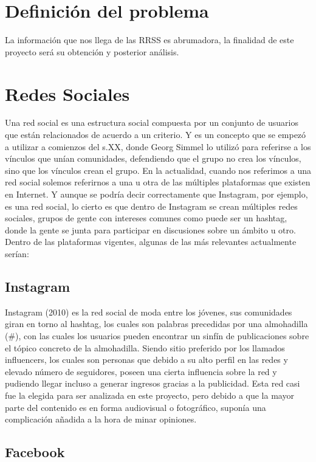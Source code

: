 	\section{Definición del problema}
	
	La información que nos llega de las RRSS es abrumadora, la finalidad de este proyecto será su obtención y posterior análisis.
	
	\section{Redes Sociales}
	
	Una red social es una estructura social compuesta por un conjunto de usuarios que están relacionados de acuerdo a un criterio. Y es un concepto que se empezó a utilizar a comienzos del s.XX, donde Georg Simmel lo utilizó para referirse a los vínculos que unían comunidades, defendiendo que el grupo no crea los vínculos, sino que los vínculos crean el grupo. En la actualidad, cuando nos referimos a una red social solemos referirnos a una u otra de las múltiples plataformas que existen en Internet. Y aunque se podría decir correctamente que Instagram, por ejemplo, es una red social, lo cierto es que dentro de Instagram se crean múltiples redes sociales, grupos de gente con intereses comunes como puede ser un hashtag, donde la gente se junta para participar en discusiones sobre un ámbito u otro. Dentro de las plataformas vigentes, algunas de las más relevantes actualmente serían: 
	
	\subsection{Instagram}
	
	Instagram (2010) es la red social de moda entre los jóvenes, sus comunidades giran en torno al hashtag, los cuales son palabras precedidas por una almohadilla (\#), con las cuales los usuarios pueden encontrar un sinfín de publicaciones sobre el tópico concreto de la almohadilla. Siendo sitio preferido por los llamados influencers, los cuales son personas que debido a su alto perfil en las redes y elevado número de seguidores, poseen una cierta influencia sobre la red y pudiendo llegar incluso a generar ingresos gracias a la publicidad. Esta red casi fue la elegida para ser analizada en este proyecto, pero debido a que la mayor parte del contenido es en forma audiovisual o fotográfico, suponía una complicación añadida a la hora de minar opiniones. 
	
	\subsection{Facebook}
	

